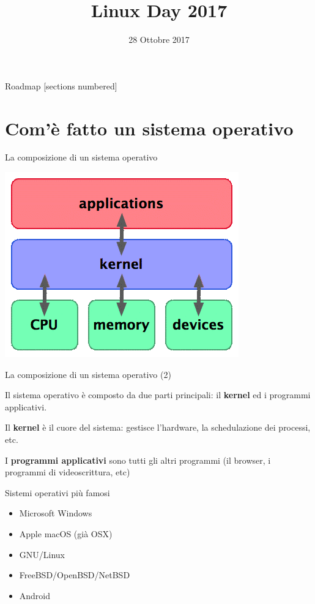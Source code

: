 \documentclass[10pt]{beamer}
\title{Linux Day 2017}
\subtitle{}
\date{28 Ottobre 2017}
\author{}
\institute{Latina Linux User Group}
\begin{document}

\maketitle

\begin{frame}{Roadmap}
  [sections numbered]
  \tableofcontents[hideallsubsections]
\end{frame}


\section{Com'è fatto un sistema operativo}

\begin{frame}{La composizione di un sistema operativo}

\centering \includegraphics[scale=0.5]{kernel}

\end{frame}

\begin{frame}{La composizione di un sistema operativo (2)}

Il sistema operativo è composto da due parti principali: il \textbf{kernel} ed i programmi applicativi.

Il \textbf{kernel} è il cuore del sistema: gestisce l'hardware, la schedulazione dei processi, etc.

I \textbf{programmi applicativi} sono tutti gli altri programmi (il browser, i programmi di videoscrittura, etc)

\end{frame}

\begin{frame}{Sistemi operativi più famosi}

\begin{itemize}
\item Microsoft Windows
\item Apple macOS (già OSX)
\item GNU/Linux
\item FreeBSD/OpenBSD/NetBSD
\item Android
\end{itemize}

\end{frame}
\end{document}
